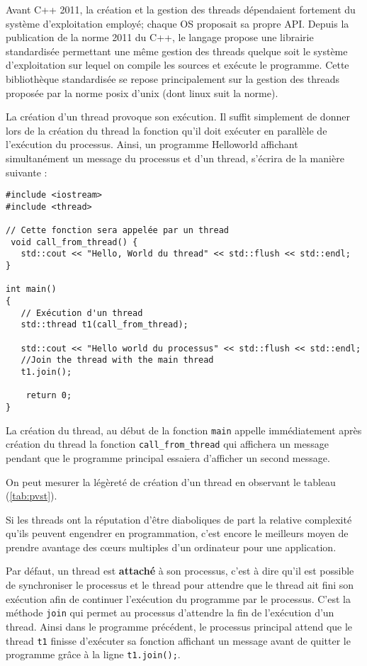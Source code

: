 \documentclass[fleqn,11pt]{article}
\begin{document}
Avant C++ 2011, la création et la gestion des threads dépendaient fortement du système d'exploitation employé; chaque OS proposait sa propre API. Depuis la publication de la norme 2011 du C++, le langage propose
une librairie standardisée permettant une même gestion des threads quelque soit le système d'exploitation
sur lequel on compile les sources et exécute le programme. Cette bibliothèque standardisée se repose
principalement sur la gestion des threads proposée par la norme posix d'unix (dont linux suit la norme).

La création d'un thread provoque son exécution. Il suffit simplement de donner lors de la création du thread
la fonction qu'il doit exécuter en parallèle de l'exécution du processus. Ainsi, un programme
Helloworld affichant simultanément un message du processus et d'un thread, s'écrira de la manière suivante :

\begin{lstlisting}
#include <iostream>
#include <thread>

// Cette fonction sera appelée par un thread
 void call_from_thread() {
   std::cout << "Hello, World du thread" << std::flush << std::endl;
}

int main()
{
   // Exécution d'un thread
   std::thread t1(call_from_thread);

   std::cout << "Hello world du processus" << std::flush << std::endl;
   //Join the thread with the main thread
   t1.join();

    return 0;
}
\end{lstlisting}

La création du thread, au début de la fonction \texttt{main} appelle immédiatement après création du thread
la fonction \texttt{call\_from\_thread} qui affichera un message pendant que le programme principal essaiera
d'afficher un second message.

On peut mesurer la légèreté de création d'un thread en observant le tableau (\ref{tab:pvst}).

Si les threads ont la réputation d'être diaboliques de part la relative complexité
qu'ils peuvent engendrer en programmation, c'est encore le meilleurs moyen de prendre
avantage des c{\oe}urs multiples d'un ordinateur pour une application.

Par défaut, un thread est \textbf{attaché} à son processus, c'est à dire qu'il est
possible de synchroniser  le processus et le thread pour attendre que le thread ait fini son
exécution afin de continuer l'exécution du programme par le processus. C'est la méthode \texttt{join}
qui permet au processus d'attendre la fin de l'exécution d'un thread. Ainsi dans le programme précédent,
le processus principal attend que le thread \texttt{t1} finisse d'exécuter sa fonction affichant
un message avant de quitter le programme grâce à la ligne \lstinline{t1.join();}.
\end{document}
